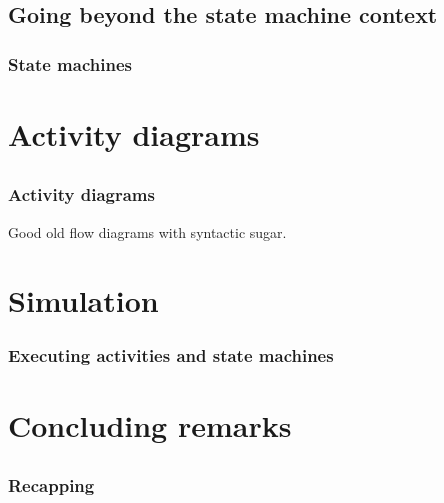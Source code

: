 \documentclass[xcolor=dvipsnames,t]{beamer}
\begin{document}
\subsection{Going beyond the state machine context}


\begin{frame}
\frametitle {State machines}
\end{frame}

\section{Activity diagrams}
\subsection{}
\begin{frame}
\frametitle {Activity diagrams}
Good old flow diagrams with syntactic sugar.
\end{frame}


\section{Simulation}
\begin{frame}
\frametitle {Executing activities and state machines}
\end{frame}

\section{Concluding remarks}
\subsection{}
\begin{frame}
\frametitle {Recapping}
\end{frame}
\end{document}
